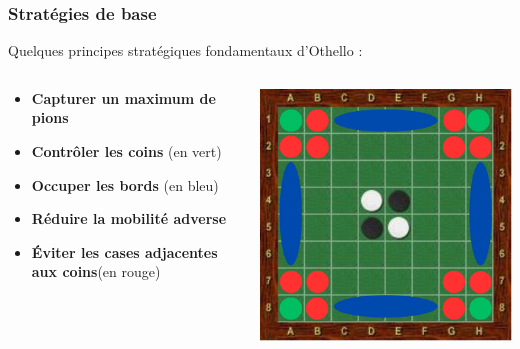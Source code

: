 \begin{frame}
\frametitle{Stratégies de base}

Quelques principes stratégiques fondamentaux d’Othello :
\vspace{1em}
\begin{columns}
    \begin{column}{0.65\textwidth}
        \begin{itemize}
            \item \textbf{Capturer un maximum de pions}
            \vspace{0.5em}
        
            \item \textbf{Contrôler les coins} (en vert)
            \vspace{0.5em}
        
            \item \textbf{Occuper les bords} (en bleu)
            \vspace{0.5em}
         
            \item \textbf{Réduire la mobilité adverse}
            \vspace{0.5em}
           
            \item \textbf{Éviter les cases adjacentes aux coins}(en rouge)
        \end{itemize}
    \end{column} 
    \begin{column}{0.35\textwidth}
        \includegraphics[width=\linewidth]{img/othello-strategie-de-base.png}
    \end{column}
\end{columns}
\end{frame}

